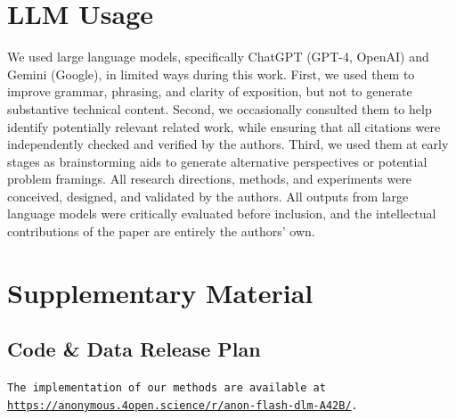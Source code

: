 



\section{LLM Usage}
We used large language models, specifically ChatGPT (GPT-4, OpenAI) and Gemini (Google), in limited ways during this work. First, we used them to improve grammar, phrasing, and clarity of exposition, but not to generate substantive technical content. Second, we occasionally consulted them to help identify potentially relevant related work, while ensuring that all citations were independently checked and verified by the authors. Third, we used them at early stages as brainstorming aids to generate alternative perspectives or potential problem framings. All research directions, methods, and experiments were conceived, designed, and validated by the authors. All outputs from large language models were critically evaluated before inclusion, and the intellectual contributions of the paper are entirely the authors' own.



\section{Supplementary Material}
\subsection{Code \& Data Release Plan}\label{sec:app-release}
\texttt{The implementation of our methods are available at \url{https://anonymous.4open.science/r/anon-flash-dlm-A42B/}.}




